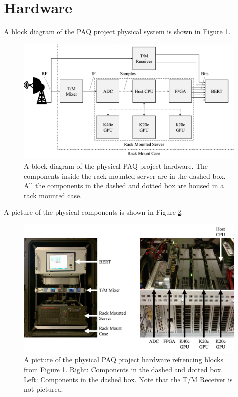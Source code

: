 \section{Hardware}
\label{sec:hardware}
A block diagram of the PAQ project physical system is shown in Figure \ref{fig:hardwareblock}.
\begin{figure}
	\centering\includegraphics[width=11.58in/100*55]{figures/systemOverview/hardwareblock.pdf}
	\caption{A block diagram of the physical PAQ project hardware. The components inside the rack mounted server are in the dashed box. All the components in the dashed and dotted box are housed in a rack mounted case.}
	\label{fig:hardwareblock}
\end{figure}
A picture of the physical components is shown in Figure \ref{fig:HostSystem}.
\begin{figure}
	\centering\includegraphics[scale=0.55]{figures/systemOverview/HostSystem.jpg}
	\caption{A picture of the physical PAQ project hardware refrencing blocks from Figure \ref{fig:hardwareblock}. Right: Components in the dashed and dotted box. Left: Components in the dashed box. Note that the T/M Receiver is not pictured.}
	\label{fig:HostSystem}
\end{figure}
